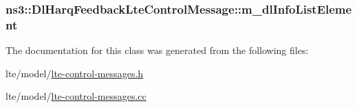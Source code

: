\subsubsection[{\texorpdfstring{m\+\_\+dl\+Info\+List\+Element}{m_dlInfoListElement}}]{ ns3\+::\+Dl\+Harq\+Feedback\+Lte\+Control\+Message\+::m\+\_\+dl\+Info\+List\+Element\hspace{0.3cm}{\ttfamily [private]}}\hypertarget{classns3_1_1DlHarqFeedbackLteControlMessage_ac6b2a3bb27c420462d953eab0c847ae7}{}\label{classns3_1_1DlHarqFeedbackLteControlMessage_ac6b2a3bb27c420462d953eab0c847ae7}


The documentation for this class was generated from the following files\+:\begin{DoxyCompactItemize}
\item 
lte/model/\hyperlink{lte-control-messages_8h}{lte-\/control-\/messages.\+h}\item 
lte/model/\hyperlink{lte-control-messages_8cc}{lte-\/control-\/messages.\+cc}\end{DoxyCompactItemize}
